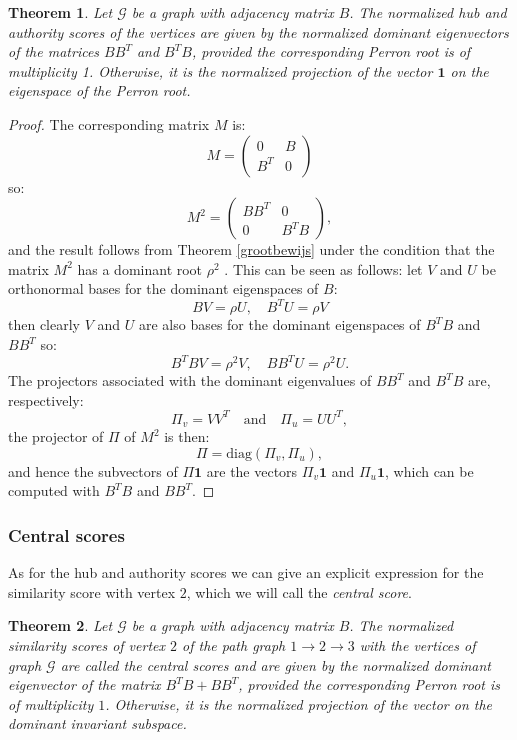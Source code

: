 \documentclass[a4paper,11pt]{report}
\newtheorem{theorem}{Theorem}[section]
\newcommand{\graf}{\mathscr{G}}
\begin{document}
\begin{theorem}
  Let $\graf$ be a graph with adjacency matrix $B$. The normalized hub and 
  authority scores of the vertices are given by the normalized dominant 
  eigenvectors of the matrices $BB^T$ and $B^TB$, provided the corresponding 
  Perron root is of multiplicity 1. Otherwise, it is the normalized projection 
  of the vector $\mathbf{1}$ on the eigenspace of the Perron root.
\end{theorem}
\begin{proof}
  The corresponding matrix $M$ is:
  $$M =  \begin{pmatrix} 
0 & B\\
B^T & 0
\end{pmatrix}$$
so:
$$M^2 = \begin{pmatrix} 
BB^T & 0\\
0 & B^TB
\end{pmatrix},$$
and the result follows from Theorem \ref{grootbewijs} under the condition that 
the matrix $M^2$ has a dominant root $\rho^2$ . This can be seen as follows: let $V$ and $U$ be
orthonormal bases for the dominant eigenspaces of $B$:
$$BV = \rho U, \quad B^TU = \rho V$$
then clearly $V$ and $U$ are also bases for the dominant eigenspaces of $B^TB$ 
and $BB^T$ so:
$$B^TBV = \rho^2V, \quad BB^TU= \rho^2U.$$
The projectors associated with the dominant eigenvalues of $BB^T$ and $B^TB$ 
are, respectively:
$$\Pi_v = VV^T \quad \text{and} \quad \Pi_u = UU^T,$$
the projector of $\Pi$ of $M^2$ is then:
$$\Pi = \text{diag}(\Pi_v, \Pi_u),$$
and hence the subvectors of $\Pi\mathbf{1}$ are the vectors $\Pi_{v}\mathbf{1}$ 
and $\Pi_u\mathbf{1}$, which can be computed with $B^TB$ and $BB^T$.
\end{proof}


\subsubsection{Central scores}
As for the hub and authority scores we can give an explicit expression for the 
similarity score with vertex $2$, which we will call the \emph{central score}. 
\begin{theorem}\label{centralescore}
  Let $\graf$ be a graph with adjacency matrix $B$. The normalized similarity scores of vertex $2$ 
  of the path graph $1 \to 2 \to 3$ with the vertices of graph $\graf$ are called the central 
  scores and are given by the normalized dominant eigenvector of the matrix 
  $B^TB+BB^T$, provided the corresponding Perron root is of multiplicity $1$. 
  Otherwise, it is the normalized projection of the vector  on the 
  dominant invariant subspace.
  \end{theorem}
  
\end{document}
